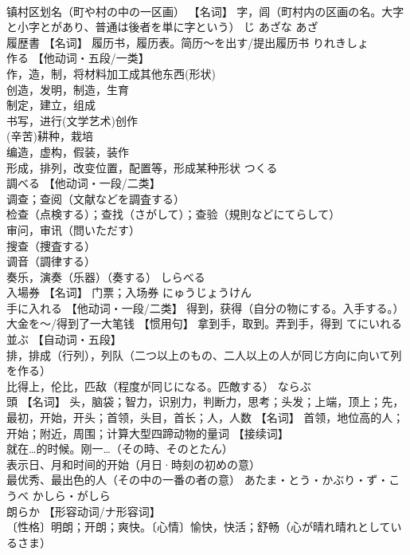 \documentclass[8pt]{extreport}
\begin{document}
\begin{CJK}{UTF8}{min}
\\	镇村区划名（町や村の中の一区画） 【名词】 字，闾（町村内の区画の名。大字と小字とがあり、普通は後者を単に字という）	じ あざな あざ	
\\	履歴書	【名词】 履历书，履历表。简历～を出す/提出履历书	りれきしょ	
\\	作る	【他动词・五段/一类】 
\\	作，造，制，将材料加工成其他东西(形状) 
\\	创造，发明，制造，生育 
\\	制定，建立，组成 
\\	书写，进行(文学艺术)创作 
\\	(辛苦)耕种，栽培 
\\	编造，虚构，假装，装作 
\\	形成，排列，改变位置，配置等，形成某种形状	つくる	
\\	調べる	【他动词・一段/二类】 
\\	调查；查阅（文献などを調査する） 
\\	检查（点検する）；查找（さがして）；查验（規則などにてらして） 
\\	审问，审讯（問いただす） 
\\	搜查（捜査する） 
\\	调音（調律する） 
\\	奏乐，演奏（乐器）（奏する）	しらべる	
\\	入場券	【名词】 门票；入场券	にゅうじょうけん	
\\	手に入れる	【他动词・一段/二类】 得到，获得（自分の物にする。入手する。） 大金を〜/得到了一大笔钱 【惯用句】 拿到手，取到。弄到手，得到	てにいれる	
\\	並ぶ	【自动词・五段】 
\\	排，排成（行列），列队（二つ以上のもの、二人以上の人が同じ方向に向いて列を作る） 
\\	比得上，伦比，匹敌（程度が同じになる。匹敵する）	ならぶ	
\\	頭	【名词】 头，脑袋；智力，识别力，判断力，思考；头发；上端，顶上；先，最初，开始，开头；首领，头目，首长；人，人数 【名词】 首领，地位高的人；开始；附近，周围；计算大型四蹄动物的量词 【接续词】 
\\	就在…的时候。刚一…（その時、そのとたん） 
\\	表示日、月和时间的开始（月日·時刻の初めの意） 
\\	最优秀、最出色的人（その中の一番の者の意）	あたま・とう・かぶり・ず・こうべ かしら・がしら	
\\	朗らか	【形容动词/ナ形容词】 
\\	〔性格〕明朗；开朗；爽快。〔心情〕愉快，快活；舒畅（心が晴れ晴れとしているさま） 

\end{CJK}
\end{document}
